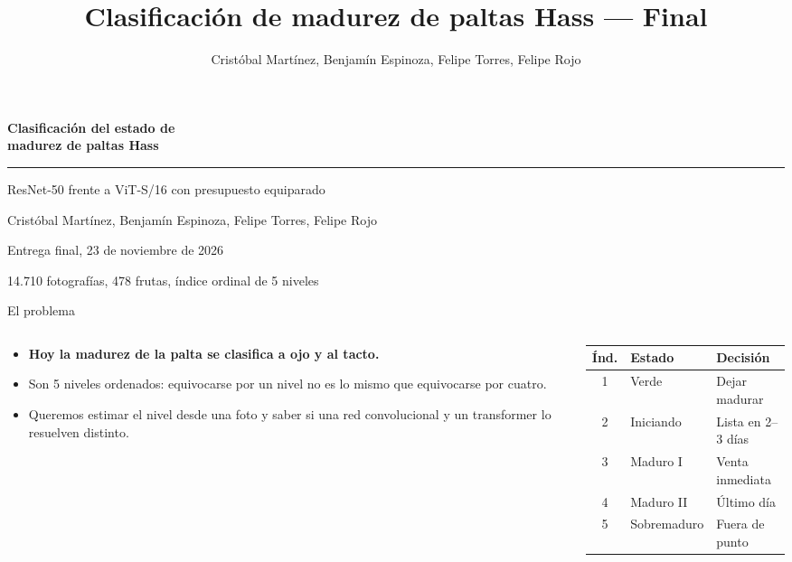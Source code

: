 \documentclass[aspectratio=169,11pt,table]{beamer}
\title{Clasificación de madurez de paltas Hass --- Final}
\author{Cristóbal Martínez, Benjamín Espinoza, Felipe Torres, Felipe Rojo}
\begin{document}
{
\begin{frame}[plain]
  \vspace{1.4cm}
  {\color{white}\Huge\bfseries\linespread{1.15}\selectfont Clasificación del estado de\\madurez de paltas Hass}

  \vspace{0.55cm}
  {\color{verdecla}\rule{\textwidth}{1.6pt}}

  \vspace{0.55cm}
  {\color{white!85!verdecla}\large ResNet-50 frente a ViT-S/16 con presupuesto equiparado}

  \vfill
  {\color{white!70!verdecla}\small Cristóbal Martínez, Benjamín Espinoza, Felipe Torres, Felipe Rojo}

  \vspace{0.15em}
  {\color{white!70!verdecla}\small Entrega final, 23 de noviembre de 2026}

  \vspace{0.2em}
  {\color{white!60!verdecla}\footnotesize 14.710 fotografías, 478 frutas, índice ordinal de 5 niveles}
  \vspace{0.6cm}
\end{frame}
}

\begin{frame}{El problema}\relax
\begin{columns}[T]
\begin{column}{0.50\textwidth}
{\small
\setlength{\itemsep}{0.5em}
\begin{itemize}
  \item {\bfseries Hoy la madurez de la palta se clasifica a ojo y al tacto.}
  \item Son 5 niveles ordenados: equivocarse por un nivel no es lo mismo que equivocarse por cuatro.
  \item Queremos estimar el nivel desde una foto y saber si una red convolucional y un transformer lo resuelven distinto.
\end{itemize}
}
\end{column}
\begin{column}{0.46\textwidth}
{\small
\centering
\begin{tabular}{cll}
\toprule
\rowcolor{verdeosc}\color{white}\bfseries Índ. & \color{white}\bfseries Estado & \color{white}\bfseries Decisión \\
\midrule
1 & Verde & Dejar madurar \\
2 & Iniciando & Lista en 2--3 días \\
3 & Maduro I & Venta inmediata \\
4 & Maduro II & Último día \\
5 & Sobremaduro & Fuera de punto \\
\bottomrule
\end{tabular}
}
\end{column}
\end{columns}
\end{frame}
\end{document}
